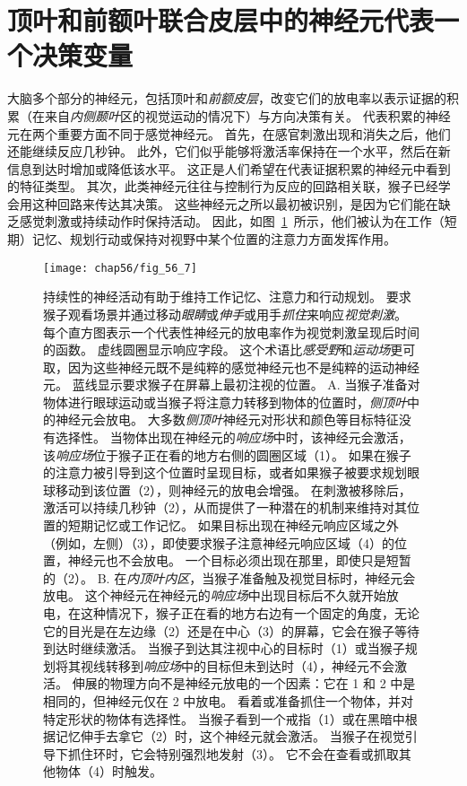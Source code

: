 \section{顶叶和前额叶联合皮层中的神经元代表一个决策变量}

大脑多个部分的神经元，包括顶叶和\textit{前额皮层}，改变它们的放电率以表示证据的积累（在来自\textit{内侧颞叶}区的视觉运动的情况下）与方向决策有关。
代表积累的神经元在两个重要方面不同于感觉神经元。
首先，在感官刺激出现和消失之后，他们还能继续反应几秒钟。
此外，它们似乎能够将激活率保持在一个水平，然后在新信息到达时增加或降低该水平。
这正是人们希望在代表证据积累的神经元中看到的特征类型。
其次，此类神经元往往与控制行为反应的回路相关联，猴子已经学会用这种回路来传达其决策。
这些神经元之所以最初被识别，是因为它们能在缺乏感觉刺激或持续动作时保持活动。
因此，如图~\ref{fig:56_7}~所示，他们被认为在工作（短期）记忆、规划行动或保持对视野中某个位置的注意力方面发挥作用。


\begin{figure}[htbp]
	\centering
	\texttt{[image: chap56/fig\_56\_7]}
	\caption{持续性的神经活动有助于维持工作记忆、注意力和行动规划。
		要求猴子观看场景并通过移动\textit{眼睛}或\textit{伸手}或用手\textit{抓住}来响应\textit{视觉刺激}。
		每个直方图表示一个代表性神经元的放电率作为视觉刺激呈现后时间的函数。
		虚线圆圈显示响应字段。
		这个术语比\textit{感受野}和\textit{运动场}更可取，因为这些神经元既不是纯粹的感觉神经元也不是纯粹的运动神经元。
		蓝线显示要求猴子在屏幕上最初注视的位置。
		A. 当猴子准备对物体进行眼球运动或当猴子将注意力转移到物体的位置时，\textit{侧顶叶}中的神经元会放电。
		大多数\textit{侧顶叶}神经元对形状和颜色等目标特征没有选择性。
		当物体出现在神经元的\textit{响应场}中时，该神经元会激活，该\textit{响应场}位于猴子正在看的地方右侧的圆圈区域（1）。
		如果在猴子的注意力被引导到这个位置时呈现目标，或者如果猴子被要求规划眼球移动到该位置（2），则神经元的放电会增强。
		在刺激被移除后，激活可以持续几秒钟（2），从而提供了一种潜在的机制来维持对其位置的短期记忆或工作记忆。
		如果目标出现在神经元响应区域之外（例如，左侧）（3），即使要求猴子注意神经元响应区域（4）的位置，神经元也不会放电。
		一个目标必须出现在那里，即使只是短暂的（2）。
		B. 在\textit{内顶叶内区}，当猴子准备触及视觉目标时，神经元会放电。
		这个神经元在神经元的\textit{响应场}中出现目标后不久就开始放电，在这种情况下，猴子正在看的地方右边有一个固定的角度，无论它的目光是在左边缘（2）还是在中心（3）的屏幕，它会在猴子等待到达时继续激活。
		当猴子到达其注视中心的目标时（1）或当猴子规划将其视线转移到\textit{响应场}中的目标但未到达时（4），神经元不会激活。
		伸展的物理方向不是神经元放电的一个因素：它在 1 和 2 中是相同的，但神经元仅在 2 中放电。
		看着或准备抓住一个物体，并对特定形状的物体有选择性。
		当猴子看到一个戒指（1）或在黑暗中根据记忆伸手去拿它（2）时，这个神经元就会激活。
		当猴子在视觉引导下抓住环时，它会特别强烈地发射（3）。
		它不会在查看或抓取其他物体（4）时触发。}
	\label{fig:56_7}
\end{figure}



